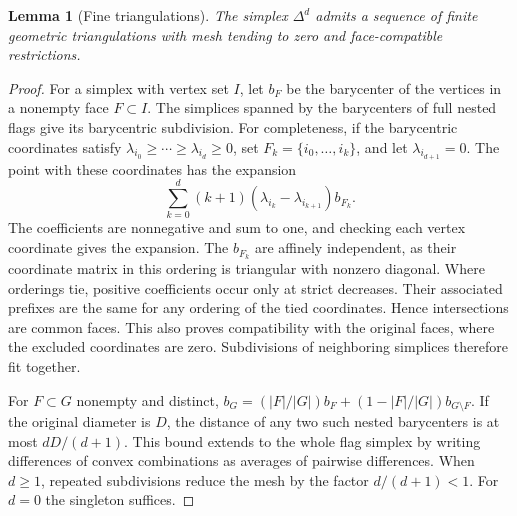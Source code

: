 \documentclass[11pt,oneside,openany]{book}
\theoremstyle{plain}
\newtheorem{lemma}[theorem]{Lemma}
\theoremstyle{definition}
\theoremstyle{remark}
\begin{document}
\begin{lemma}[Fine triangulations]
\label{lem:fine-simplex-triangulations}
The simplex \(\Delta^d\) admits a sequence of finite geometric
triangulations with mesh tending to zero and face-compatible
restrictions.
\end{lemma}
\begin{proof}
For a simplex with vertex set \(I\), let \(b_F\) be the barycenter
of the vertices in a nonempty face \(F\subset I\).
The simplices spanned by the barycenters of full nested flags
give its barycentric subdivision. For completeness, if the
barycentric coordinates satisfy
\(\lambda_{i_0}\ge\cdots\ge\lambda_{i_d}\ge0\), set
\(F_k=\{i_0,\ldots,i_k\}\), and let \(\lambda_{i_{d+1}}=0\).
The point with these coordinates has the expansion
\[
 \sum_{k=0}^{d}(k+1)(\lambda_{i_k}-\lambda_{i_{k+1}})b_{F_k}.
\]
The coefficients are nonnegative and sum to one, and checking
each vertex coordinate gives the expansion. The \(b_{F_k}\)
are affinely independent, as their coordinate matrix in this
ordering is triangular with nonzero diagonal. Where orderings
tie, positive coefficients occur only at strict decreases.
Their associated prefixes are the same for any ordering
of the tied coordinates. Hence intersections are common
faces. This also proves compatibility with the original faces,
where the excluded coordinates are zero. Subdivisions of
neighboring simplices therefore fit together.

For \(F\subset G\) nonempty and distinct,
\(b_G=(|F|/|G|)b_F+(1-|F|/|G|)b_{G\setminus F}\).
If the original diameter is \(D\), the distance of any two
such nested barycenters is at most \(dD/(d+1)\). This bound
extends to the whole flag simplex by writing differences
of convex combinations as averages of pairwise differences.
When \(d\ge1\), repeated subdivisions reduce the mesh by
the factor \(d/(d+1)<1\). For \(d=0\) the singleton suffices.
\end{proof}
\end{document}
